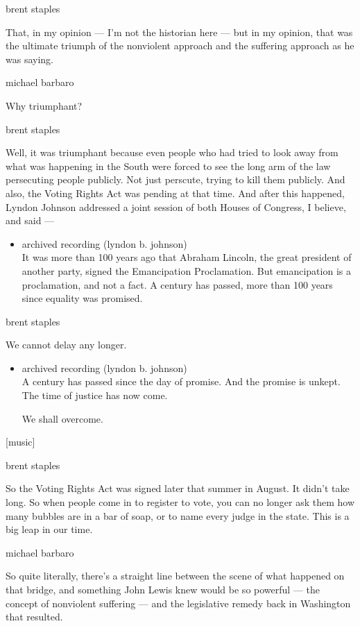 brent staples

That, in my opinion --- I'm not the historian here --- but in my
opinion, that was the ultimate triumph of the nonviolent approach and
the suffering approach as he was saying.

michael barbaro

Why triumphant?

brent staples

Well, it was triumphant because even people who had tried to look away
from what was happening in the South were forced to see the long arm of
the law persecuting people publicly. Not just perscute, trying to kill
them publicly. And also, the Voting Rights Act was pending at that time.
And after this happened, Lyndon Johnson addressed a joint session of
both Houses of Congress, I believe, and said ---

\begin{itemize}
\tightlist
\item
  archived recording (lyndon b. johnson)\\
  It was more than 100 years ago that Abraham Lincoln, the great
  president of another party, signed the Emancipation Proclamation. But
  emancipation is a proclamation, and not a fact. A century has passed,
  more than 100 years since equality was promised.
\end{itemize}

brent staples

We cannot delay any longer.

\begin{itemize}
\item
  archived recording (lyndon b. johnson)\\
  A century has passed since the day of promise. And the promise is
  unkept. The time of justice has now come.

  We shall overcome.
\end{itemize}

{[}music{]}

brent staples

So the Voting Rights Act was signed later that summer in August. It
didn't take long. So when people come in to register to vote, you can no
longer ask them how many bubbles are in a bar of soap, or to name every
judge in the state. This is a big leap in our time.

michael barbaro

So quite literally, there's a straight line between the scene of what
happened on that bridge, and something John Lewis knew would be so
powerful --- the concept of nonviolent suffering --- and the legislative
remedy back in Washington that resulted.


